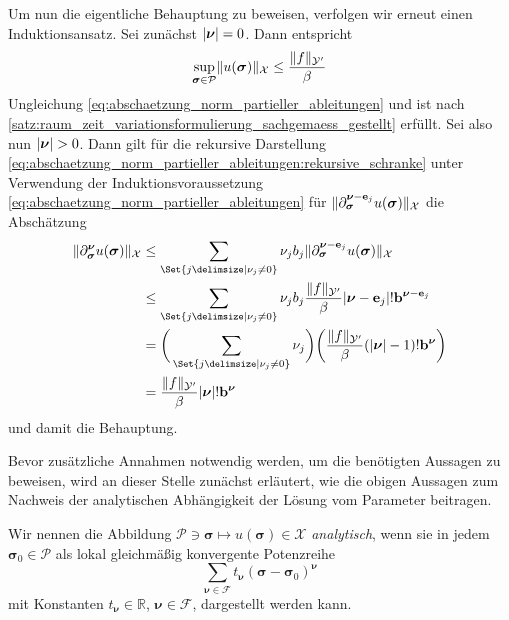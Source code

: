 \documentclass[../main.tex]{subfiles}
\begin{document}
\begin{Satz}
\begin{Beweis}
        Um nun die eigentliche Behauptung zu beweisen, verfolgen wir erneut einen Induktionsansatz.
        Sei zunächst $\lvert\bm\nu\rvert = 0$.
        Dann entspricht
        \begin{equation}
            \sup_{\bm \sigma \in \mathcal P} \lVert u(\bm\sigma)\rVert_{\mathcal X} \leq \frac{\lVert f\rVert_{\mathcal Y'}}{\beta}
        \end{equation}
        Ungleichung \cref{eq:abschaetzung_norm_partieller_ableitungen} und ist nach \cref{satz:raum_zeit_variationsformulierung_sachgemaess_gestellt} erfüllt.
        Sei also nun $\lvert\bm\nu\rvert > 0$.
        Dann gilt für die rekursive Darstellung \cref{eq:abschaetzung_norm_partieller_ableitungen:rekursive_schranke} unter Verwendung der Induktionsvoraussetzung \cref{eq:abschaetzung_norm_partieller_ableitungen} für $\lVert\partial^{\bm\nu - \mathbf{e}_{j}}_{\bm\sigma} u(\bm\sigma)\rVert_{\mathcal X}$ die Abschätzung
        \begin{align}
            \norm{\partial^{\bm\nu}_{\bm\sigma} u(\bm\sigma)}_{\mathcal X}
            &\leq
            \sum_{\Set{j \given \nu_{j} \neq 0}} \nu_{j} b_{j} \norm{\partial^{\bm\nu - \vec e_{j}}_{\bm\sigma} u(\bm\sigma)}_{\mathcal X}
            \\&\leq
            \sum_{\Set{j \given \nu_{j} \neq 0}} \nu_{j} b_{j} \frac{\norm{f}_{\mathcal Y'}}{\beta} \abs{\bm\nu - \vec e_{j}}! \vec b^{\bm\nu - \vec e_{j}}
            \\&=
            \bigg( \sum_{\Set{j \given \nu_{j} \neq 0}} \nu_{j} \bigg) \bigg( \frac{\norm{f}_{\mathcal Y'}}{\beta} (\abs{\bm\nu} - 1)! \vec b^{\bm\nu} \bigg)
            \\&=
            \frac{\norm{f}_{\mathcal Y'}}{\beta} \abs{\bm\nu}! \vec b^{\bm\nu}
         \end{align}
         und damit die Behauptung.
    \end{Beweis}
\end{Satz}

Bevor zusätzliche Annahmen notwendig werden, um die benötigten Aussagen zu beweisen, wird an dieser Stelle zunächst erläutert, wie die obigen Aussagen zum Nachweis der analytischen Abhängigkeit der Lösung vom Parameter beitragen.

\begin{Definition}
\label{definition:analytisch}
    Wir nennen die Abbildung $\mathcal P \ni \bm \sigma \mapsto u(\bm \sigma) \in \mathcal X$ \emph{analytisch}, wenn sie in jedem $\bm\sigma_{0} \in \mathcal P$ als lokal gleichmäßig konvergente Potenzreihe
    \begin{equation}
        \sum_{\bm \nu \in \mathcal F} t_{\bm \nu} (\bm \sigma - \bm \sigma_{0})^{\bm \nu}
    \end{equation}
    mit Konstanten $t_{\bm \nu} \in \mathbb{R}$, $\bm \nu \in \mathcal F$, dargestellt werden kann.
\end{Definition}
\end{document}
